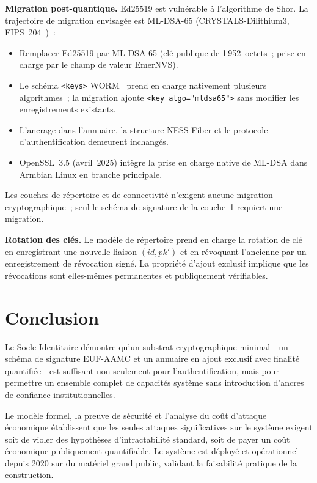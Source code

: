 \documentclass[11pt,a4paper]{article}
\begin{document}
\textbf{Migration post-quantique.}  Ed25519 est vulnérable à l'algorithme de
Shor.  La trajectoire de migration envisagée est ML-DSA-65 (CRYSTALS-Dilithium3,
FIPS~204~\cite{fips204})~:
\begin{itemize}[leftmargin=*]
  \item Remplacer Ed25519 par ML-DSA-65 (clé publique de 1\,952~octets~;
    prise en charge par le champ de valeur EmerNVS).
  \item Le schéma \texttt{<keys>} WORM~\cite{worm} prend en charge nativement
    plusieurs algorithmes~; la migration ajoute
    \texttt{<key algo="mldsa65">} sans modifier les enregistrements existants.
  \item L'ancrage dans l'annuaire, la structure NESS Fiber et le protocole
    d'authentification demeurent inchangés.
  \item OpenSSL~3.5 (avril~2025) intègre la prise en charge native de ML-DSA
    dans Armbian Linux en branche principale.
\end{itemize}
Les couches de répertoire et de connectivité n'exigent aucune migration cryptographique~;
seul le schéma de signature de la couche~1 requiert une migration.

\textbf{Rotation des clés.}  Le modèle de répertoire prend en charge la
rotation de clé en enregistrant une nouvelle liaison $(id, pk')$ et en
révoquant l'ancienne par un enregistrement de révocation signé.  La propriété
d'ajout exclusif implique que les révocations sont elles-mêmes permanentes et
publiquement vérifiables.

\section{Conclusion}

Le Socle Identitaire démontre qu'un substrat cryptographique minimal---un
schéma de signature EUF-AAMC et un annuaire en ajout exclusif avec finalité
quantifiée---est suffisant non seulement pour l'authentification, mais pour
permettre un ensemble complet de capacités système sans introduction d'ancres
de confiance institutionnelles.

Le modèle formel, la preuve de sécurité et l'analyse du coût d'attaque
économique établissent que les seules attaques significatives sur le système
exigent soit de violer des hypothèses d'intractabilité standard, soit de payer
un coût économique publiquement quantifiable.  Le système est déployé et
opérationnel depuis 2020 sur du matériel grand public, validant la faisabilité
pratique de la construction.
\end{document}
